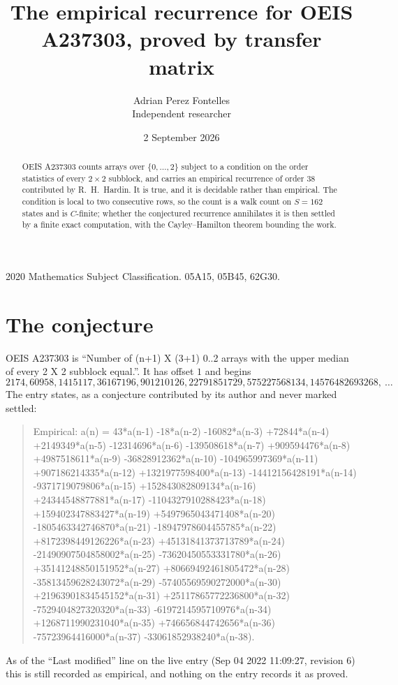 \documentclass[11pt,a4paper]{article}
\title{The empirical recurrence for OEIS A237303, proved by transfer matrix}
\author{Adrian Perez Fontelles\\ \small Independent researcher}
\date{2 September 2026}
\theoremstyle{plain}
\theoremstyle{definition}
\begin{document}
\maketitle

\begin{abstract}
OEIS A237303 counts arrays over $\{0,\dots,2\}$ subject to a condition on the order
statistics of every $2\times2$ subblock, and carries an empirical recurrence of order
$38$ contributed by R.~H.~Hardin. It is true, and it is decidable rather than empirical.
The condition is local to two consecutive rows, so the count is a walk count on $S=162$
states and is $C$-finite; whether the conjectured recurrence annihilates it is then settled by
a finite exact computation, with the Cayley--Hamilton theorem bounding the work.
\end{abstract}

\noindent\small 2020 Mathematics Subject Classification. 05A15, 05B45, 62G30.\normalsize

\section{The conjecture}

OEIS A237303 is ``Number of (n+1) X (3+1) 0..2 arrays with the upper median of every 2 X 2 subblock equal.''. It has offset $1$ and begins
\[
2174, 60958, 1415117, 36167196, 901210126, 22791851729, 575227568134, 14576482693268,\ \dots
\]
The entry states, as a conjecture contributed by its author and never marked settled:
\begin{quote}
Empirical: a(n) = 43*a(n-1) -18*a(n-2) -16082*a(n-3) +72844*a(n-4) +2149349*a(n-5) -12314696*a(n-6) -139508618*a(n-7) +909594476*a(n-8) +4987518611*a(n-9) -36828912362*a(n-10) -104965997369*a(n-11) +907186214335*a(n-12) +1321977598400*a(n-13) -14412156428191*a(n-14) -9371719079806*a(n-15) +152843082809134*a(n-16) +24344548877881*a(n-17) -1104327910288423*a(n-18) +159402347883427*a(n-19) +5497965043471408*a(n-20) -1805463342746870*a(n-21) -18947978604455785*a(n-22) +8172398449126226*a(n-23) +45131841373713789*a(n-24) -21490907504858002*a(n-25) -73620450553331780*a(n-26) +35141248850151952*a(n-27) +80669492461805472*a(n-28) -35813459628243072*a(n-29) -57405569590272000*a(n-30) +21963901834545152*a(n-31) +25117865772236800*a(n-32) -7529404827320320*a(n-33) -6197214595710976*a(n-34) +1268711990231040*a(n-35) +746656844742656*a(n-36) -75723964416000*a(n-37) -33061852938240*a(n-38).
\end{quote}
As of the ``Last modified'' line on the live entry (Sep 04 2022 11:09:27, revision 6) this is still
recorded as empirical, and nothing on the entry records it as proved.
\end{document}
